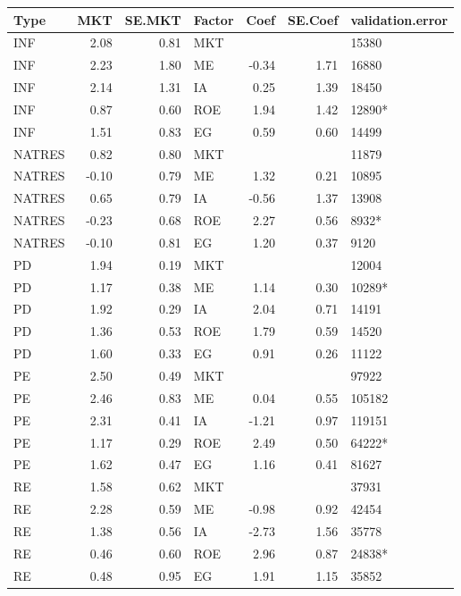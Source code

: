 \documentclass[12pt]{article}
\begin{document}
\begin{table}[ht]
	\centering
	\begin{tabular}{lrrlrrl}
		Type & MKT & SE.MKT & Factor & Coef & SE.Coef & validation.error \\ 
		\hline
		\hline
		INF & 2.08 & 0.81 & MKT &  &  & 15380 \\ 
		INF & 2.23 & 1.80 & ME & -0.34 & 1.71 & 16880 \\ 
		INF & 2.14 & 1.31 & IA & 0.25 & 1.39 & 18450 \\ 
		INF & 0.87 & 0.60 & ROE & 1.94 & 1.42 & 12890* \\ 
		INF & 1.51 & 0.83 & EG & 0.59 & 0.60 & 14499 \\ 
		\hline
		NATRES & 0.82 & 0.80 & MKT &  &  & 11879 \\ 
		NATRES & -0.10 & 0.79 & ME & 1.32 & 0.21 & 10895 \\ 
		NATRES & 0.65 & 0.79 & IA & -0.56 & 1.37 & 13908 \\ 
		NATRES & -0.23 & 0.68 & ROE & 2.27 & 0.56 & 8932* \\ 
		NATRES & -0.10 & 0.81 & EG & 1.20 & 0.37 & 9120 \\ 
		\hline
		PD & 1.94 & 0.19 & MKT &  &  & 12004 \\ 
		PD & 1.17 & 0.38 & ME & 1.14 & 0.30 & 10289* \\ 
		PD & 1.92 & 0.29 & IA & 2.04 & 0.71 & 14191 \\ 
		PD & 1.36 & 0.53 & ROE & 1.79 & 0.59 & 14520 \\ 
		PD & 1.60 & 0.33 & EG & 0.91 & 0.26 & 11122 \\ 
		\hline
		PE & 2.50 & 0.49 & MKT &  &  & 97922 \\ 
		PE & 2.46 & 0.83 & ME & 0.04 & 0.55 & 105182 \\ 
		PE & 2.31 & 0.41 & IA & -1.21 & 0.97 & 119151 \\ 
		PE & 1.17 & 0.29 & ROE & 2.49 & 0.50 & 64222* \\ 
		PE & 1.62 & 0.47 & EG & 1.16 & 0.41 & 81627 \\ 
		\hline
		RE & 1.58 & 0.62 & MKT &  &  & 37931 \\ 
		RE & 2.28 & 0.59 & ME & -0.98 & 0.92 & 42454 \\ 
		RE & 1.38 & 0.56 & IA & -2.73 & 1.56 & 35778 \\ 
		RE & 0.46 & 0.60 & ROE & 2.96 & 0.87 & 24838* \\ 
		RE & 0.48 & 0.95 & EG & 1.91 & 1.15 & 35852 \\ 

\end{tabular}
\end{table}
\end{document}
